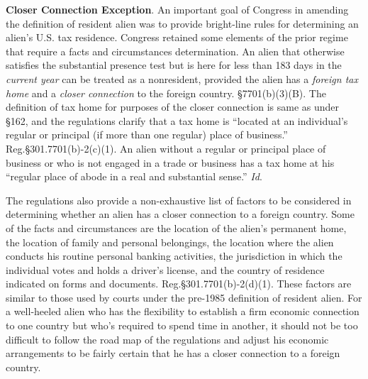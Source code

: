  
 \textbf{Closer Connection Exception}. An important goal of Congress in amending the definition of resident alien was to provide bright-line rules for determining an alien's U.S. tax residence.  Congress retained some elements of the prior regime that require a facts and circumstances determination.  An alien that otherwise satisfies the substantial presence test but is here for less than 183 days in the \emph{current year} can be treated as a nonresident, provided the alien has a  \emph{foreign tax home} and a \emph{closer connection} to the foreign country.  \S7701(b)(3)(B).  The definition of tax home for purposes of the closer connection is same as under \S162, and the regulations clarify that a tax home is ``located at an individual's regular or principal (if more than one regular) place of business.''  Reg.\@ \S301.7701(b)-2(c)(1).  An alien without a regular or principal place of business or who is not engaged in a trade or business has a tax home at his ``regular place of abode in a real and substantial sense.''  \emph{Id}.  
 
The regulations also provide a non-exhaustive list of factors to be considered in determining whether an alien has a closer connection to a foreign country.  Some of the facts and circumstances are the location of the alien's permanent home, the location of family and personal belongings, the location where the alien conducts his routine personal banking activities, the jurisdiction in which the individual votes and holds a driver's license, and the country of residence indicated on forms and documents.   Reg.\@ \S301.7701(b)-2(d)(1).  These factors are similar to those used by courts under the pre-1985 definition of resident alien.  For a well-heeled alien who has the flexibility to establish a firm economic connection to one country but who's required to spend time in another, it should not be too difficult to follow the road map of the regulations and adjust his economic arrangements to be fairly certain that he has a closer connection to a foreign country.       


